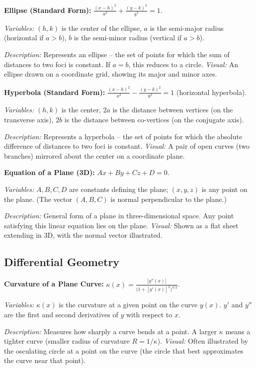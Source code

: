 \documentclass{article}
\begin{document}
\textbf{Ellipse (Standard Form):} $\displaystyle \frac{(x-h)^2}{a^2} + \frac{(y-k)^2}{b^2} = 1$.

\textit{Variables:} $(h,k)$ is the center of the ellipse, $a$ is the semi-major radius (horizontal if $a>b$), $b$ is the semi-minor radius (vertical if $a>b$).

\textit{Description:} Represents an ellipse – the set of points for which the sum of distances to two foci is constant. If $a = b$, this reduces to a circle. \textit{Visual:} An ellipse drawn on a coordinate grid, showing its major and minor axes.

\textbf{Hyperbola (Standard Form):} $\displaystyle \frac{(x-h)^2}{a^2} - \frac{(y-k)^2}{b^2} = 1$ (horizontal hyperbola).

\textit{Variables:} $(h,k)$ is the center, $2a$ is the distance between vertices (on the transverse axis), $2b$ is the distance between co-vertices (on the conjugate axis).

\textit{Description:} Represents a hyperbola – the set of points for which the absolute difference of distances to two foci is constant. \textit{Visual:} A pair of open curves (two branches) mirrored about the center on a coordinate plane.

\textbf{Equation of a Plane (3D):} $Ax + By + Cz + D = 0$.

\textit{Variables:} $A, B, C, D$ are constants defining the plane; $(x,y,z)$ is any point on the plane. (The vector $(A,B,C)$ is normal perpendicular to the plane.)

\textit{Description:} General form of a plane in three-dimensional space. Any point satisfying this linear equation lies on the plane. \textit{Visual:} Shown as a flat sheet extending in 3D, with the normal vector illustrated.

\subsection*{Differential Geometry}

\textbf{Curvature of a Plane Curve:} $\displaystyle \kappa(x) = \frac{|y''(x)|}{\big(1 + [y'(x)]^2\big)^{3/2}}$.

\textit{Variables:} $\kappa(x)$ is the curvature at a given point on the curve $y(x)$. $y'$ and $y''$ are the first and second derivatives of $y$ with respect to $x$.

\textit{Description:} Measures how sharply a curve bends at a point. A larger $\kappa$ means a tighter curve (smaller radius of curvature $R=1/\kappa$). \textit{Visual:} Often illustrated by the osculating circle at a point on the curve (the circle that best approximates the curve near that point).
\end{document}
